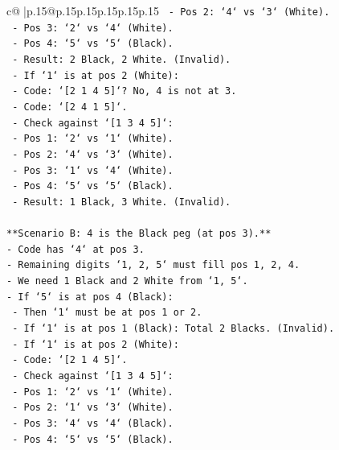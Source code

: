 \documentclass{article}
\begin{document}
{\begin{supertabular}{c@{$\;$}|p{.15\linewidth}@{}p{.15\linewidth}p{.15\linewidth}p{.15\linewidth}p{.15\linewidth}p{.15\linewidth}}
{{{\texttt{            {-} Pos 2: `4` vs `3` (White).} \\
\texttt{            {-} Pos 3: `2` vs `4` (White).} \\
\texttt{            {-} Pos 4: `5` vs `5` (Black).} \\
\texttt{            {-} Result: 2 Black, 2 White. (Invalid).} \\
\texttt{    {-} If `1` is at pos 2 (White):} \\
\texttt{        {-} Code: `{[}2 1 4 5{]}`? No, 4 is not at 3.} \\
\texttt{        {-} Code: `{[}2 4 1 5{]}`.} \\
\texttt{        {-} Check against `{[}1 3 4 5{]}`:} \\
\texttt{            {-} Pos 1: `2` vs `1` (White).} \\
\texttt{            {-} Pos 2: `4` vs `3` (White).} \\
\texttt{            {-} Pos 3: `1` vs `4` (White).} \\
\texttt{            {-} Pos 4: `5` vs `5` (Black).} \\
\texttt{            {-} Result: 1 Black, 3 White. (Invalid).} \\
\\ 
\texttt{**Scenario B: 4 is the Black peg (at pos 3).**} \\
\texttt{{-} Code has `4` at pos 3.} \\
\texttt{{-} Remaining digits `1, 2, 5` must fill pos 1, 2, 4.} \\
\texttt{{-} We need 1 Black and 2 White from `1, 5`.} \\
\texttt{{-} If `5` is at pos 4 (Black):} \\
\texttt{    {-} Then `1` must be at pos 1 or 2.} \\
\texttt{    {-} If `1` is at pos 1 (Black): Total 2 Blacks. (Invalid).} \\
\texttt{    {-} If `1` is at pos 2 (White):} \\
\texttt{        {-} Code: `{[}2 1 4 5{]}`.} \\
\texttt{        {-} Check against `{[}1 3 4 5{]}`:} \\
\texttt{            {-} Pos 1: `2` vs `1` (White).} \\
\texttt{            {-} Pos 2: `1` vs `3` (White).} \\
\texttt{            {-} Pos 3: `4` vs `4` (Black).} \\
\texttt{            {-} Pos 4: `5` vs `5` (Black).} \\
}}}
\end{supertabular}}
\end{document}
